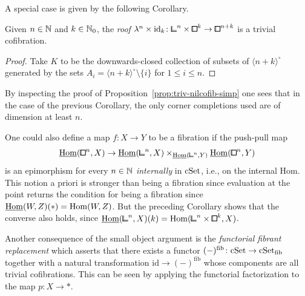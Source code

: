 A special case is given by the following Corollary.

\begin{corollary}\label{cor:internal-nilfib}
Given $n\in{\mathbb{N}}$ and $k\in{\mathbb{N}}_0$, the \emph{roof} $\lambda^n\times\mathrm{id}_k\colon{\bbcor}^n\times{\bbox}^k\to{\bbox}^{n+k}$ is a trivial cofibration.
\end{corollary}

\begin{proof}
Take $K$ to be the downwards-closed collection of subsets of $\langle n+k\rangle^\circ$
generated by the sets $A_i = \langle n+k\rangle^\circ\setminus\{i\}$ for $1\leq i\leq n$.
\end{proof}

\begin{remark}\label{prop:internal-nilfib}
By inspecting the proof of Proposition~\ref{prop:triv-nilcofib-simp}
one sees that in the case of the previous Corollary,
the only corner completions used are of dimension at least $n$.
\end{remark}

\begin{remark}\label{rem:internal-nilfib}
One could also define a map $f\colon X\to Y$ to be a fibration if the push-pull map
\[
    \ihom({\bbox}^n,X)\to\ihom({\bbcor}^n,X)\times_{\ihom({\bbcor}^n,Y)}\ihom({\bbox}^n,Y)
\]
is an epimorphism for every $n\in{\mathbb{N}}$ \emph{internally} in $\mathrm{cSet}$, i.e., on the internal Hom.
This notion a priori is stronger than being a fibration since evaluation at the point
returns the condition for being a fibration since $\underline{\operatorname{Hom}}(W,Z)(\ast) = \operatorname{Hom}(W,Z)$.
But the preceding Corollary shows that the converse also holds, since $\ihom({\bbcor}^n,X)(k)=\hom({\bbcor}^{n}\times {\bbox}^k,X)$.
\end{remark}

Another consequence of the small object argument is the \emph{functorial fibrant replacement}
which asserts that there exists a functor $(-)^\mathrm{fib}\colon\mathrm{cSet}\to{\mathrm{cSet}_\mathrm{fib}}$
together with a natural transformation $\mathrm{id}\to(-)^\mathrm{fib}$
whose components are all trivial cofibrations.
This can be seen by applying the functorial factorization to the map $p\colon X\to\ast$.

